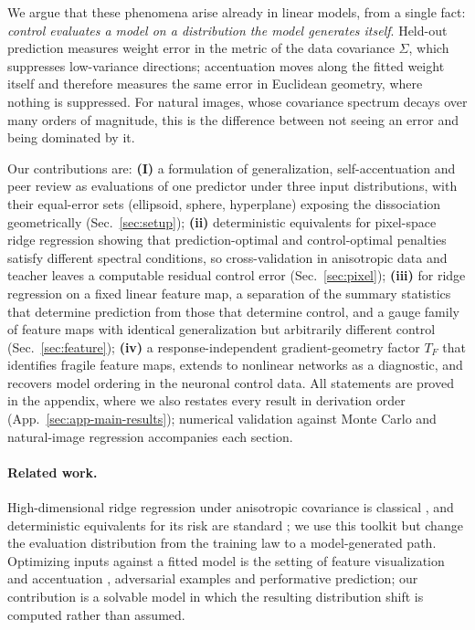 We argue that these phenomena arise already in linear models, from a single fact: \emph{control evaluates a model on a distribution the model generates itself}. Held-out prediction measures weight error in the metric of the data covariance $\Sigma$, which suppresses low-variance directions; accentuation moves along the fitted weight itself and therefore measures the same error in Euclidean geometry, where nothing is suppressed. For natural images, whose covariance spectrum decays over many orders of magnitude, this is the difference between not seeing an error and being dominated by it.

Our contributions are:
\textbf{(I)} a formulation of generalization, self-accentuation and peer review as evaluations of one predictor under three input distributions, with their equal-error sets (ellipsoid, sphere, hyperplane) exposing the dissociation geometrically (Sec.~\ref{sec:setup});
\textbf{(ii)} deterministic equivalents for pixel-space ridge regression showing that prediction-optimal and control-optimal penalties satisfy different spectral conditions, so cross-validation in anisotropic data and teacher leaves a computable residual control error (Sec.~\ref{sec:pixel});
\textbf{(iii)} for ridge regression on a fixed linear feature map, a separation of the summary statistics that determine prediction from those that determine control, and a gauge family of feature maps with identical generalization but arbitrarily different control (Sec.~\ref{sec:feature});
\textbf{(iv)} a response-independent gradient-geometry factor $T_F$ that identifies fragile feature maps, extends to nonlinear networks as a diagnostic, and recovers model ordering in the neuronal control data.
All statements are proved in the appendix, where we also restates every result in derivation order (App.~\ref{sec:app-main-results}); numerical validation against Monte Carlo and natural-image regression accompanies each section.

\paragraph{Related work.}
High-dimensional ridge regression under anisotropic covariance is classical \citep{dobriban2018high,hastie2022surprises}, and deterministic equivalents for its risk are standard \citep{bai2010spectral,couillet2011random}; we use this toolkit but change the evaluation distribution from the training law to a model-generated path. Optimizing inputs against a fitted model is the setting of feature visualization and accentuation \citep{olah2017feature,hamblin2024feature}, adversarial examples and performative prediction; our contribution is a solvable model in which the resulting distribution shift is computed rather than assumed. %

